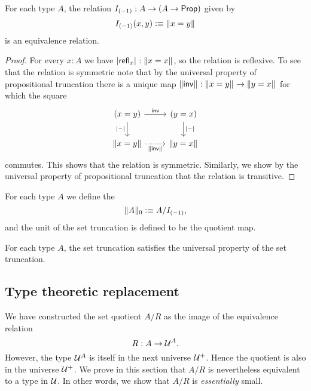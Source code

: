 \begin{lem}
For each type $A$, the relation $I_{(-1)}:A\to (A\to\prop)$ given by
\begin{equation*}
I_{(-1)}(x,y)\defeq\brck{x=y}
\end{equation*}
is an equivalence relation.
\end{lem}

\begin{proof}
For every $x:A$ we have $\bproj{\refl{x}}:\brck{x=x}$, so the relation is reflexive. To see that the relation is symmetric note that by the universal property of propositional truncation there is a unique map $\brck{\invfunc}:\brck{x=y}\to\brck{y=x}$ for which the square
\begin{equation*}
\begin{tikzcd}
(x=y) \arrow[r,"\invfunc"] \arrow[d,swap,"\bproj{\blank}"] & (y=x) \arrow[d,"\bproj{\blank}"] \\
\brck{x=y} \arrow[r,densely dotted,swap,"\brck{\invfunc}"] & \brck{y=x}
\end{tikzcd}
\end{equation*}
commutes. This shows that the relation is symmetric. Similarly, we show by the universal property of propositional truncation that the relation is transitive.
\end{proof}

\begin{defn}
For each type $A$ we define the 
\begin{equation*}
\trunc{0}{A}\defeq A/I_{(-1)},
\end{equation*}
and the unit of the set truncation is defined to be the quotient map.
\end{defn}

\begin{thm}
For each type $A$, the set truncation satisfies the universal property of the set truncation.
\end{thm}

\subsection{Type theoretic replacement}

We have constructed the set quotient $A/R$ as the image of the equivalence relation
\begin{equation*}
  R:A\to \UU^A.
\end{equation*}
However, the type $\UU^A$ is itself in the next universe $\UU^+$. Hence the quotient is also in the universe $\UU^+$. We prove in this section that $A/R$ is nevertheless equivalent to a type in $\UU$. In other words, we show that $A/R$ is \emph{essentially} small. 

